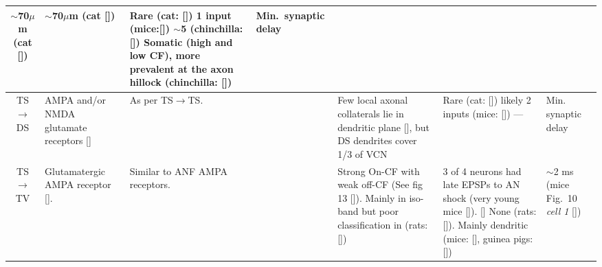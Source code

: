\begin{longtable}{cYYYYYY}
$\sim$70$\mu$m (cat []) 
                                & %
$\sim$70$\mu$m (cat []) 
                                & %
Rare (cat: []) 
1 input (mice:[])                     
$\sim$5 (chinchilla: [])
Somatic (high and low CF), more prevalent at the axon hillock   
(chinchilla: [])
                                & %
Min.\ synaptic delay \\ \midrule
TS\ensuremath{\rightarrow}DS                        
                                & %
AMPA and/or NMDA glutamate receptors []  
                                & 
As per TS\ensuremath{\rightarrow}TS.
                                & %
                                & %
Few local axonal collaterals lie in dendritic plane [], but DS dendrites cover 1/3 of VCN
                                & 
Rare  (cat: [])
likely 2 inputs (mice: []) 
---                                     
                                & 
Min. synaptic delay \\ \midrule
TS\ensuremath{\rightarrow}TV                        
                                & %
Glutamatergic AMPA receptor  [].
                                & 
Similar to ANF AMPA receptors.        
                                & %

                                & %
Strong On-CF with weak off-CF  (See fig 13 []). 
Mainly in iso-band but poor classification in (rats: [])         
                                & %
3 of 4 neurons had late EPSPs to AN shock (very young mice []).
[] 
None (rats: []).
Mainly dendritic (mice: [],
guinea pigs: [])   
                                & %
$\sim$2 ms (mice Fig.~10 \textit{cell 1} [])
\\ \midrule



\end{longtable}
